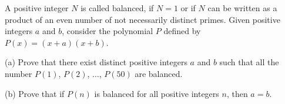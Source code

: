 A positive integer $N$ is called balanced, if $N=1$ or if $N$ can be written as a product of an even number of not necessarily distinct primes. Given positive integers $a$ and $b$,  consider the polynomial $P$ defined by $P(x)=(x+a)(x+b)$.

(a) Prove that there exist distinct positive integers $a$ and $b$ such that all the number $P(1)$,  $P(2)$, $\ldots$,  $P(50)$ are balanced.

(b) Prove that if $P(n)$ is balanced for all positive integers $n$,  then $a=b$.